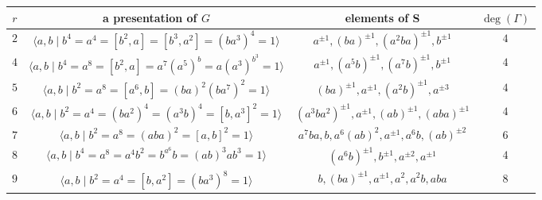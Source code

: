 \documentclass{amsart}
\begin{document}
{\footnotesize
	\begin{table}
		\centering
		\begin{tabular}{|c|c|c|c|}
			\hline
			$r$& a presentation of $G$ &elements of S & $\deg(\Gamma)$ \\ \hline
			$2$& $\langle a,b\mid b^{4}=a^{4}=[b^2,a]=[b^3,a^2]=(ba^{3})^4=1\rangle$&  $ a^{\pm 1}, (ba)^{\pm 1}, (a^2ba)^{\pm 1}, b^{\pm 1}$ &$4$\\
			$4$&$ \langle a,b\mid b^4=a^8=[b^2,a]=a^7(a^5)^b=a(a^3)^{b^3}=1\rangle$&  $ a^{\pm 1}, (a^5b)^{\pm 1}, (a^7b)^{\pm 1}, b^{\pm 1}$ &$4$ \\
			$5$&$\langle a,b\mid b^2=a^8=[a^6,b]=(ba)^2(ba^{7})^2 =1\rangle$&  $(ba)^{\pm 1}, a^{\pm 1}, (a^2b)^{\pm 1}, a^{\pm 3}$&$4$\\
			$6$&$\langle a,b\mid b^2=a^4=(ba^2)^4=(a^3b)^4=[b,a^3]^2=1\rangle$&   $ (a^3ba^2)^{\pm 1}, a^{\pm 1}, (ab)^{\pm 1}, (aba)^{\pm 1}$& $4$\\
			$7$&$\langle a,b\mid b^2=a^8=(aba)^2=[a,b]^2=1 \rangle $& $a^7ba, b, a^6(ab)^2, a^{\pm 1}, a^6b, (ab)^{\pm 2}$& $6$\\
			$8$& $\langle a,b\mid b^4=a^8=a^4b^2=b^{a^{6}}b=(ab)^3ab^{3}=1\rangle$&  $ (a^6b)^{\pm 1}, b^{\pm 1}, a^{\pm 2}, a^{\pm 1}$&$4$\\
			$9$&$ \langle a,b\mid b^2=a^4=[b,a^2]= (ba^{3})^8=1\rangle$& $ b, (ba)^{\pm 1}, a^{\pm 1}, a^2, a^2b, aba $&$8$\\

\end{tabular}
\end{table}}
\end{document}
